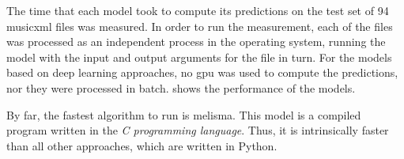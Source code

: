 
The time that each model took to compute its predictions on
the test set of 94 \gls{musicxml} files was measured. In
order to run the measurement, each of the files was
processed as an independent process in the operating system,
running the model with the input and output arguments for
the file in turn. For the models based on deep learning
approaches, no \gls{gpu} was used to compute the
predictions, nor they were processed in batch.
 shows the performance of the
models.


By far, the fastest algorithm to run is \gls{melisma}. This
model is a compiled program written in the \emph{C
programming language}. Thus, it is intrinsically faster than
all other approaches, which are written in Python.
